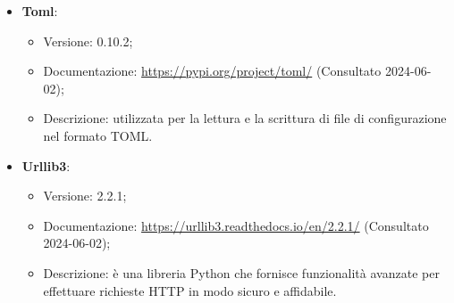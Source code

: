 \begin{itemize}
\begin{itemize}
    \end{itemize}
    \item \textbf{Toml}:
    \begin{itemize}
        \item Versione: 0.10.2;
        \item Documentazione: \url{https://pypi.org/project/toml/} (Consultato 2024-06-02);
        \item Descrizione: utilizzata per la lettura e la scrittura di file di configurazione nel formato TOML.
    \end{itemize}
    \item \textbf{Urllib3}:
    \begin{itemize}
        \item Versione: 2.2.1;
        \item Documentazione: \url{https://urllib3.readthedocs.io/en/2.2.1/} (Consultato 2024-06-02);
        \item Descrizione: è una libreria Python che fornisce funzionalità avanzate per effettuare richieste HTTP in modo sicuro e affidabile.
    \end{itemize}
\end{itemize}
